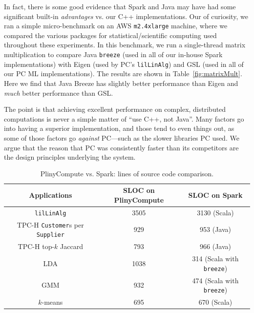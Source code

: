 In fact, there is some good evidence that Spark and Java may have had some significant
built-in \emph{advantages} vs. our C++ implementations.
Our of curiosity, we ran a simple micro-benchmark on an AWS \texttt{m2.4xlarge} machine, where we compared the various
packages for statistical/scientific computing used throughout these experiments.
In this benchmark, we run a single-thread matrix multiplication
to compare Java \texttt{breeze} (used in all of our in-house Spark implementations) 
with Eigen (used by PC's \texttt{lilLinAlg}) and GSL (used in all of our PC ML implementations).
The results are shown in Table~\ref{fig:matrixMult}.  
Here we find that Java Breeze has slightly better performance than Eigen and \emph{much}
better performance than GSL.  

The point is that achieving excellent performance on complex, distributed computations is never a simple matter
of ``use C++, not Java''.  Many factors go into having a superior implementation, and those tend to even things out,
as some of those factors 
go \emph{against} PC---such as the slower libraries PC used.  We argue that the reason that PC was consistently faster
than its competitors are the design principles underlying the system.

\begin{table}[h!]
\begin{center}
\begin{tabular}{|c|c|c|}
\hline
Applications & SLOC on PlinyCompute & SLOC on Spark\\
\hline
\texttt{lilLinAlg} &3505& 3130 (Scala)\\
TPC-H \texttt{Customer}s per \texttt{Supplier}&929 &953 (Java)\\
TPC-H top-$k$ Jaccard &793 & 966 (Java)\\
LDA &1038  &314 (Scala with \texttt{breeze})\\
GMM&932 & 474 (Scala with \texttt{breeze})\\
$k$-means &695  &670 (Scala)\\
\hline
\end{tabular}
\caption{PlinyCompute vs. Spark: lines of source code comparison.}
\label{fig:LOC}
\end{center}
\end{table}

